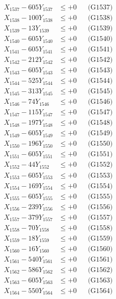 \documentclass[a4paper,10pt]{article}
\begin{document}
{\begin{align}
X_{1537} - 605Y_{1537} &\leq +0 && \text{(G1537)} \\
X_{1538} - 100Y_{1538} &\leq +0 && \text{(G1538)} \\
X_{1539} - 13Y_{1539} &\leq +0 && \text{(G1539)} \\
X_{1540} - 605Y_{1540} &\leq +0 && \text{(G1540)} \\
\allowbreak
X_{1541} - 605Y_{1541} &\leq +0 && \text{(G1541)} \\
X_{1542} - 212Y_{1542} &\leq +0 && \text{(G1542)} \\
X_{1543} - 605Y_{1543} &\leq +0 && \text{(G1543)} \\
X_{1544} - 525Y_{1544} &\leq +0 && \text{(G1544)} \\
X_{1545} - 313Y_{1545} &\leq +0 && \text{(G1545)} \\
X_{1546} - 74Y_{1546} &\leq +0 && \text{(G1546)} \\
X_{1547} - 115Y_{1547} &\leq +0 && \text{(G1547)} \\
X_{1548} - 197Y_{1548} &\leq +0 && \text{(G1548)} \\
X_{1549} - 605Y_{1549} &\leq +0 && \text{(G1549)} \\
X_{1550} - 196Y_{1550} &\leq +0 && \text{(G1550)} \\
\allowbreak
X_{1551} - 605Y_{1551} &\leq +0 && \text{(G1551)} \\
X_{1552} - 44Y_{1552} &\leq +0 && \text{(G1552)} \\
X_{1553} - 605Y_{1553} &\leq +0 && \text{(G1553)} \\
X_{1554} - 169Y_{1554} &\leq +0 && \text{(G1554)} \\
X_{1555} - 605Y_{1555} &\leq +0 && \text{(G1555)} \\
X_{1556} - 239Y_{1556} &\leq +0 && \text{(G1556)} \\
X_{1557} - 379Y_{1557} &\leq +0 && \text{(G1557)} \\
X_{1558} - 70Y_{1558} &\leq +0 && \text{(G1558)} \\
X_{1559} - 18Y_{1559} &\leq +0 && \text{(G1559)} \\
X_{1560} - 16Y_{1560} &\leq +0 && \text{(G1560)} \\
\allowbreak
X_{1561} - 540Y_{1561} &\leq +0 && \text{(G1561)} \\
X_{1562} - 586Y_{1562} &\leq +0 && \text{(G1562)} \\
X_{1563} - 605Y_{1563} &\leq +0 && \text{(G1563)} \\
X_{1564} - 550Y_{1564} &\leq +0 && \text{(G1564)} \\

\end{align}}
\end{document}
